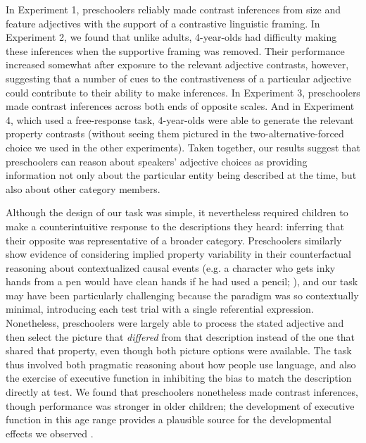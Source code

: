 \documentclass[man]{apa2}
\begin{document}
In Experiment 1, preschoolers reliably made contrast inferences from size and feature adjectives with the support of a contrastive linguistic framing.  In Experiment 2, we found that unlike adults, 4-year-olds had difficulty making these inferences when the supportive framing was removed. Their performance increased somewhat after exposure to the relevant adjective contrasts, however, suggesting that a number of cues to the contrastiveness of a particular adjective could contribute to their ability to make inferences. In Experiment 3, preschoolers made contrast inferences across both ends of opposite scales. And in Experiment 4, which used a free-response task, 4-year-olds were able to generate the relevant property contrasts (without seeing them pictured in the two-alternative-forced choice we used in the other experiments). Taken together, our results suggest that preschoolers can reason about speakers' adjective choices as providing information not only about the particular entity being described at the time, but also about other category members. 

Although the design of our task was simple, it nevertheless required children to make a counterintuitive response to the descriptions they heard: inferring that their opposite was representative of a broader category. Preschoolers similarly show evidence of considering implied property variability in their counterfactual reasoning about contextualized causal events (e.g. a character who gets inky hands from a pen would have clean hands if he had used a pencil; ), and our task may have been particularly challenging because the paradigm was so contextually minimal, introducing each test trial with a single referential expression. Nonetheless, preschoolers were largely able to process the stated adjective and then select the picture that \emph{differed} from that description instead of the one that shared that property, even though both picture options were available. 
The task thus involved both pragmatic reasoning about how people use language, and also the exercise of executive function in inhibiting the bias to match the description directly at test.  We found that preschoolers nonetheless made contrast inferences, though performance was stronger in older children; the development of executive function in this age range provides a plausible source for the developmental effects we observed \cite{davidson2006,zelazo2003}. 
\end{document}
